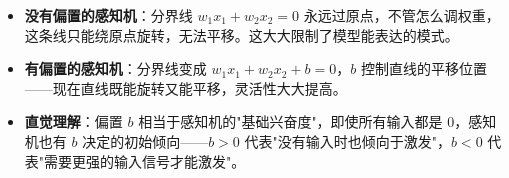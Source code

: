 \documentclass[a4paper,11pt]{ctexart}
\begin{document}
\begin{beginnerbox}
    \begin{itemize}
        \item \textbf{没有偏置的感知机}：分界线 $w_1 x_1 + w_2 x_2 = 0$ 永远过原点，不管怎么调权重，这条线只能绕原点旋转，无法平移。这大大限制了模型能表达的模式。
        \item \textbf{有偏置的感知机}：分界线变成 $w_1 x_1 + w_2 x_2 + b = 0$，$b$ 控制直线的平移位置——现在直线既能旋转又能平移，灵活性大大提高。
        \item \textbf{直觉理解}：偏置 $b$ 相当于感知机的"基础兴奋度"，即使所有输入都是 0，感知机也有 $b$ 决定的初始倾向——$b > 0$ 代表"没有输入时也倾向于激发"，$b < 0$ 代表"需要更强的输入信号才能激发"。
    \end{itemize}
\end{beginnerbox}
\end{document}

